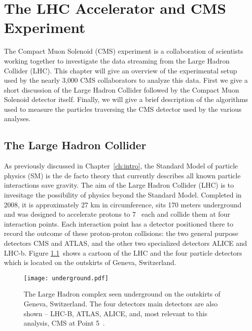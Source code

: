 \chapter{The LHC Accelerator and CMS Experiment}
\label {ch:cms}

The Compact Muon Solenoid (CMS) experiment is a collaboration of scientists
working together to investigate the data streaming from the Large Hadron
Collider (LHC). This chapter will give an overview of the experimental setup
used by the nearly 3,000 CMS collaborators to analyze this data. First 
we give a short discussion of the Large Hadron Collider followed by
the Compact Muon Solenoid detector itself. Finally, we will give a brief
description of the algorithms used to measure the particles traversing the CMS
detector used by the various analyses.

\section{The Large Hadron Collider}
\label {sec:cms_lhc}

As previously discussed in Chapter~\ref{ch:intro}, the Standard Model of
particle physics (SM) is the de facto theory that currently describes all
known particle interactions save gravity. The aim of the Large Hadron Collider
(LHC) is to invesitage the possibility of physics beyond the Standard Model.
Completed in 2008, it is approximately 27 km in circumference, sits 170
meters underground and was designed to accelerate protons to 7 \TeV~each and
collide them at four interaction points. Each interaction point has a detector
positioned there to record the outcome of these proton-proton collisions: the
two general purpose detectors CMS and ATLAS, and the other two specialized
detectors ALICE and LHC-b. Figure \ref{fig:cms_underground}~shows a cartoon of
the LHC and the four particle detectors which is located on the outskirts of
Geneva, Switzerland.

\begin{figure}[tbhp]
\centering
\texttt{[image: underground.pdf]}
\caption[The Large Hadron complex seen underground on the outskirts of  Geneva, Switzerland]
{\label{fig:cms_underground}
The Large Hadron complex seen underground on the
outskirts of Geneva, Switzerland. The four detectors main detectors are also shown -- LHC-B, ATLAS, ALICE, and, most
relevant to this analysis, CMS at Point 5~\cite{lhcmachine}.
}
\end{figure}

